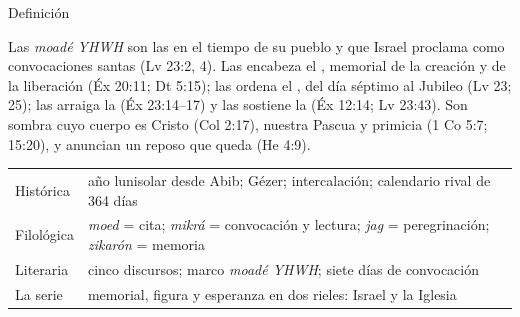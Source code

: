 \begin{frame}{Definición}
\begin{tcolorbox}[colback=papiro,colframe=tierraroja,boxrule=1pt,arc=3pt,left=5pt,right=5pt,top=3pt,bottom=3pt]
\small Las \emph{moadé YHWH} son las  en el tiempo de su pueblo y que Israel proclama como convocaciones santas (Lv 23:2, 4). Las encabeza el , memorial de la creación y de la liberación (Éx 20:11; Dt 5:15); las ordena el , del día séptimo al Jubileo (Lv 23; 25); las arraiga la  (Éx 23:14--17) y las sostiene la  (Éx 12:14; Lv 23:43). Son sombra cuyo cuerpo es Cristo (Col 2:17), nuestra Pascua y primicia (1 Co 5:7; 15:20), y anuncian un reposo que queda (He 4:9).
\end{tcolorbox}
\scriptsize\renewcommand{\arraystretch}{1.05}
\begin{tabular}{@{}L{2.1cm}L{9.8cm}@{}}
\toprule
Histórica & año lunisolar desde Abib; Gézer; intercalación; calendario rival de 364 días \\
Filológica & \emph{moed} = cita; \emph{mikrá} = convocación y lectura; \emph{jag} = peregrinación; \emph{zikarón} = memoria \\
Literaria & cinco discursos; marco \emph{moadé YHWH}; siete días de convocación \\
La serie & memorial, figura y esperanza en dos rieles: Israel y la Iglesia \\
\bottomrule
\end{tabular}
\end{frame}

